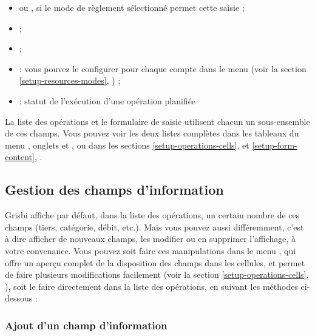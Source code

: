 \begin{itemize}
	\item {} ou , si le mode de règlement sélectionné permet cette saisie ;
	\item {} ;
	\item {} ;
	\item {} : vous pouvez le configurer pour chaque compte dans le menu  (voir la section \vref{setup-resources-modes}, ) ;
	\item {} : statut de l'exécution d'une opération planifiée
\end{itemize}

La liste des opérations et le formulaire de saisie utilisent chacun un sous-ensemble de ces champs. Vous pouvez voir les deux listes complètes dans les tableaux du menu , onglets  et , ou dans les sections \vref{setup-operations-cells},  et \vref{setup-form-content}, .


\subsection{Gestion des champs d'information\label{transactions-list-fields-manage}}

Grisbi affiche par défaut, dans la liste des opérations, un certain nombre de ces champs (tiers, catégorie, débit, etc.). Mais vous pouvez aussi  différemment, c'est à  dire afficher de nouveaux champs, les modifier ou en supprimer l'affichage, à votre convenance. 
Vous pouvez soit faire ces manipulations dans le menu , qui offre un aperçu complet de la disposition des champs dans les cellules, et permet de faire plusieurs modifications facilement (voir la section \vref{setup-operations-cells}, ), soit le faire directement dans la liste des opérations, en suivant les méthodes ci-dessous :


\subsubsection{Ajout d'un champ d'information\label{transactions-list-fields-add}}

